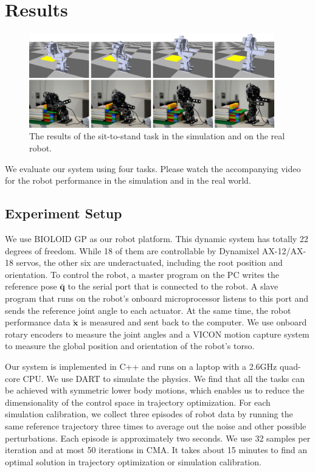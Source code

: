 \section{Results}

\begin{figure}[!t]
  \centering
  \includegraphics[width=0.95\textwidth]{figures/sit2Stand}
  \caption{The results of the sit-to-stand task in the simulation and on the real robot.}
  \vspace{-0.1in}
  \label{fig:sit2Stand}
\end{figure}

We evaluate our system using four tasks. Please watch the accompanying video for the robot performance in the simulation and in the real world.

\subsection{Experiment Setup}

We use BIOLOID GP as our robot platform. This dynamic system has totally 22 degrees of freedom. While 18 of them are controllable by Dynamixel AX-12/AX-18 servos, the other six are underactuated, including the root position and orientation. To control the robot, a master program on the PC writes the reference pose $\bar{\mathbf{q}}$ to the serial port that is connected to the robot. A slave program that runs on the robot's onboard microprocessor listens to this port and sends the reference joint angle to each actuator. At the same time, the robot performance data $\tilde{\mathbf{x}}$ is measured and sent back to the computer. We use onboard rotary encoders to measure the joint angles and a VICON motion capture system to measure the global position and orientation of the robot's torso.

Our system is implemented in C++ and runs on a laptop with a 2.6GHz quad-core CPU. We use DART to simulate the physics. We find that all the tasks can be achieved with symmetric lower body motions, which enables us to reduce the dimensionality of the control space in trajectory optimization. For each simulation calibration, we collect three episodes of robot data by running the same reference trajectory three times to average out the noise and other possible perturbations. Each episode is approximately two seconds. We use 32 samples per iteration and at most 50 iterations in CMA. It takes about 15 minutes to find an optimal solution in trajectory optimization or simulation calibration.

